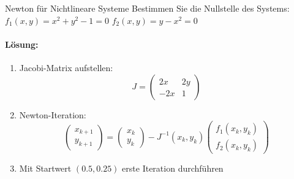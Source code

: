 \begin{example2}{Newton für Nichtlineare Systeme}
Bestimmen Sie die Nullstelle des Systems:
$f_1(x,y) = x^2 + y^2 - 1 = 0$
$f_2(x,y) = y - x^2 = 0$

\paragraph{Lösung:}
\begin{enumerate}
    \item Jacobi-Matrix aufstellen:
    $$J = \begin{pmatrix} 
    2x & 2y \\
    -2x & 1
    \end{pmatrix}$$
    
    \item Newton-Iteration:
    $$\begin{pmatrix} x_{k+1} \\ y_{k+1} \end{pmatrix} = 
    \begin{pmatrix} x_k \\ y_k \end{pmatrix} - 
    J^{-1}(x_k,y_k) \begin{pmatrix} f_1(x_k,y_k) \\ f_2(x_k,y_k) \end{pmatrix}$$
    
    \item Mit Startwert $(0.5, 0.25)$ erste Iteration durchführen
\end{enumerate}
\end{example2}

